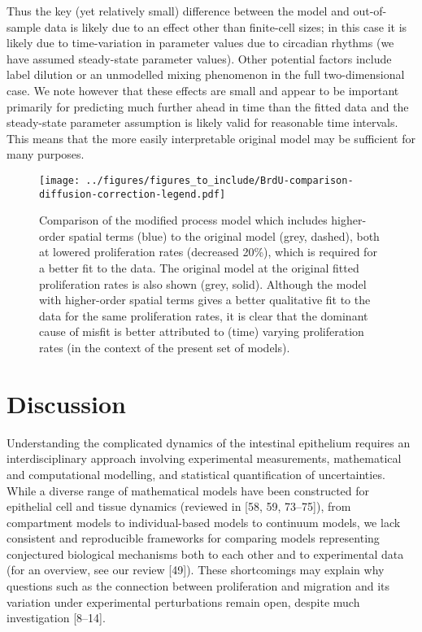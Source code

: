 \documentclass[10pt,letterpaper]{article}
\begin{document}
Thus the key (yet relatively small) difference between the model and
out-of-sample data is likely due to an effect other than finite-cell
sizes; in this case it is likely due to time-variation in parameter
values due to circadian rhythms (we have assumed steady-state parameter
values). Other potential factors include label dilution or an unmodelled
mixing phenomenon in the full two-dimensional case. We note however that
these effects are small and appear to be important primarily for
predicting much further ahead in time than the fitted data and the
steady-state parameter assumption is likely valid for reasonable time
intervals. This means that the more easily interpretable original model
may be sufficient for many purposes.

\begin{figure}
\centering
\texttt{[image: ../figures/figures\_to\_include/BrdU-comparison-diffusion-correction-legend.pdf]}
\caption{Comparison of the modified process model which includes
higher-order spatial terms (blue) to the original model (grey, dashed),
both at lowered proliferation rates (decreased 20\%), which is required
for a better fit to the data. The original model at the original fitted
proliferation rates is also shown (grey, solid). Although the model with
higher-order spatial terms gives a better qualitative fit to the data
for the same proliferation rates, it is clear that the dominant cause of
misfit is better attributed to (time) varying proliferation rates (in
the context of the present set of
models).\label{fig:BrdU-comparison-diffusion-correction}}
\end{figure}

\section{Discussion}\label{discussion}

Understanding the complicated dynamics of the intestinal epithelium
requires an interdisciplinary approach involving experimental
measurements, mathematical and computational modelling, and statistical
quantification of uncertainties. While a diverse range of mathematical
models have been constructed for epithelial cell and tissue dynamics
(reviewed in {[}58, 59, 73--75{]}), from compartment models to
individual-based models to continuum models, we lack consistent and
reproducible frameworks for comparing models representing conjectured
biological mechanisms both to each other and to experimental data (for
an overview, see our review {[}49{]}). These shortcomings may explain
why questions such as the connection between proliferation and migration
and its variation under experimental perturbations remain open, despite
much investigation {[}8--14{]}.
\end{document}
